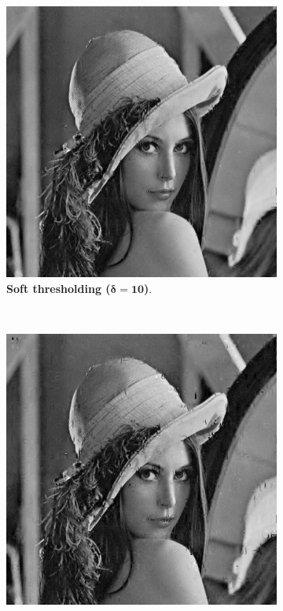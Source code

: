 \begin{figure}[!]
    \centering
    \begin{subfigure}[b]{0.4\textwidth}
        \includegraphics[width=\textwidth]{../src/inpainting/lena_soft_2}
        \caption{ \textbf{Soft thresholding ($\mathbf{\delta = 10 }$)}.}
        \label{fig:matti_soft_2}
    \end{subfigure}
    ~ %
    \begin{subfigure}[b]{0.4\textwidth}
        \includegraphics[width=\textwidth]{../src/inpainting/lena_hard_2}

\end{subfigure}
\end{figure}
